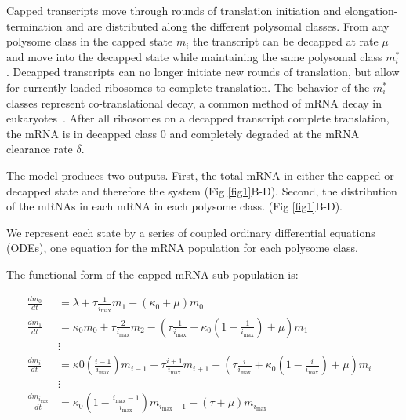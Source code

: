 \documentclass[10pt,letterpaper]{article}
\newcommand{\imax}{\ensuremath{{i_{\max}}}\xspace}
\begin{document}
Capped transcripts move through rounds of translation initiation and elongation-termination and are distributed along the different polysomal classes. 
From any polysome class in the capped state $m_i$ the transcript can be decapped at rate $\mu$  and move into the decapped state while maintaining the same polysomal class $m_i^*$.
Decapped transcripts can no longer initiate new rounds of translation, but allow for currently loaded ribosomes to complete translation. 
The behavior of the $m_i^*$ classes represent co-translational decay, a common method of mRNA decay in eukaryotes~\cite{RN3,RN23,RN4}. 
After all ribosomes on a decapped transcript complete translation, the mRNA is in decapped class 0 and completely degraded at the mRNA clearance rate $\delta$.

The model produces two outputs. 
First, the total mRNA in either the capped or decapped state and therefore the system (Fig \ref{fig1}B-D). 
Second, the distribution of the mRNAs in each mRNA in each polysome class. (Fig \ref{fig1}B-D).

We represent each state by a series of coupled ordinary differential equations (ODEs), one equation for the mRNA population for each polysome class. 

The functional form of the capped mRNA sub population is:


\begin{strip}
  \begin{align} \label{eq:Capped_ODE}
    \frac{dm_{0}}{dt} &= \lambda+ \tau \frac{1}{\imax}m_{1}-\left(\kappa_0 + \mu\right)m_{0} \nonumber \\
    \frac{dm_{1}}{dt} &= \kappa_0 m_{0}+ \tau \frac{2}{\imax}m_{2}-\left( \tau \frac{1}{\imax}+\kappa_0\left(1-\frac{1}{\imax}\right)+\mu\right) m_{1}\nonumber \\
                      & \vdots & \nonumber \\
    \frac{dm_{i}}{dt} &= \kappa0 \left(\frac{i-1}{\imax}\right) m_{i-1}+ \tau \frac{i+1}{\imax}m_{i+1}-\left( \tau \frac{i}{\imax}+\kappa_0\left(1-\frac{i}{\imax}\right)+\mu\right) m_{i} \nonumber \\
                      & \vdots & \nonumber \\
    \frac{dm_{\imax}}{dt} &= \kappa_0\left(1-\frac{\imax-1}{\imax}\right)m_{\imax-1}-\left( \tau +\mu\right) m_{\imax}
  \end{align}
\end{strip}
\end{document}
